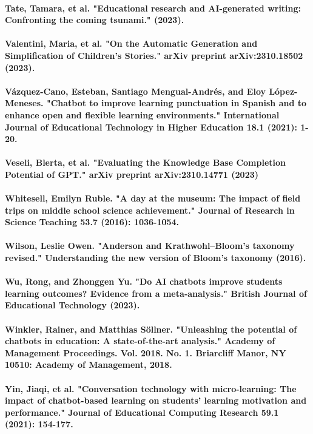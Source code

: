 \documentclass{article}
\begin{document}
\paragraph{Tate, Tamara, et al. "Educational research and AI-generated writing: Confronting the coming tsunami." (2023).}
\paragraph{Valentini, Maria, et al. "On the Automatic Generation and Simplification of Children's Stories." arXiv preprint arXiv:2310.18502 (2023).}
\paragraph{Vázquez-Cano, Esteban, Santiago Mengual-Andrés, and Eloy López-Meneses. "Chatbot to improve learning punctuation in Spanish and to enhance open and flexible learning environments." International Journal of Educational Technology in Higher Education 18.1 (2021): 1-20.}
\paragraph{Veseli, Blerta, et al. "Evaluating the Knowledge Base Completion Potential of GPT." arXiv preprint arXiv:2310.14771 (2023)}
\paragraph{Whitesell, Emilyn Ruble. "A day at the museum: The impact of field trips on middle school science achievement." Journal of Research in Science Teaching 53.7 (2016): 1036-1054. }
\paragraph{Wilson, Leslie Owen. "Anderson and Krathwohl–Bloom’s taxonomy revised." Understanding the new version of Bloom's taxonomy (2016). }
\paragraph{Wu, Rong, and Zhonggen Yu. "Do AI chatbots improve students learning outcomes? Evidence from a meta‐analysis." British Journal of Educational Technology (2023).}
\paragraph{Winkler, Rainer, and Matthias Söllner. "Unleashing the potential of chatbots in education: A state-of-the-art analysis." Academy of Management Proceedings. Vol. 2018. No. 1. Briarcliff Manor, NY 10510: Academy of Management, 2018.}
\paragraph{Yin, Jiaqi, et al. "Conversation technology with micro-learning: The impact of chatbot-based learning on students’ learning motivation and performance." Journal of Educational Computing Research 59.1 (2021): 154-177.}
\end{document}
